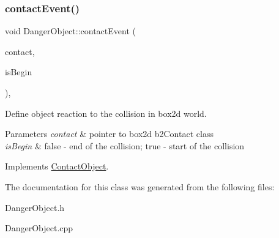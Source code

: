 \subsubsection{\texorpdfstring{contact\+Event()}{contactEvent()}}
{\footnotesize\ttfamily void Danger\+Object\+::contact\+Event (\begin{DoxyParamCaption}\item[{b2\+Contact $\ast$}]{contact,  }\item[{bool}]{is\+Begin }\end{DoxyParamCaption})\hspace{0.3cm}{\ttfamily [private]}, {\ttfamily [virtual]}}



Define object reaction to the collision in box2d world. 


\begin{DoxyParams}{Parameters}
{\em contact} & pointer to box2d b2\+Contact class \\
\hline
{\em is\+Begin} & \textquotesingle{}false\textquotesingle{} -\/ end of the collision; \textquotesingle{}true\textquotesingle{} -\/ start of the collision \\
\hline
\end{DoxyParams}


Implements \hyperlink{class_contact_object_a53d2dfc1d9c2821e9c62e80ce62a6435}{Contact\+Object}.



The documentation for this class was generated from the following files\+:\begin{DoxyCompactItemize}
\item 
Danger\+Object.\+h\item 
Danger\+Object.\+cpp\end{DoxyCompactItemize}

